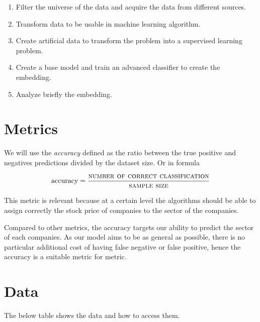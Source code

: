 \documentclass[a4paper,twoside]{article}
\begin{document}
\begin{enumerate}
\item Filter the universe of the data and acquire the data from different
sources.
\item Transform data to be usable in machine learning algorithm.
\item Create artificial data to transform the problem into a supervised learning problem.
\item Create a base model and train an advanced classifier to create the embedding.
\item Analyze briefly the embedding.
\end{enumerate}




\section{Metrics}
\label{sec:orgda57672}

We will use the \emph{accuracy} defined as the ratio between the true positive and
negatives predictions divided by the dataset size. Or in formula

\begin{align*}
  \textrm{accuracy} = \frac{\textsc{number of correct classification} }{\textsc{sample size}}
\end{align*}

This metric is relevant because at a certain level the algorithms should be
able to assign correctly the stock price of companies to the sector of the
companies.

Compared to other metrics, the accuracy targets our ability to predict the
sector of each companies. As our model aims to be as general as possible,
there is no particular additional cost of having false negative or false
positive, hence the accuracy is a suitable metric for metric.


\section{Data}
\label{sec:orge8906e6}

The below table shows the data and how to access them.
\end{document}

